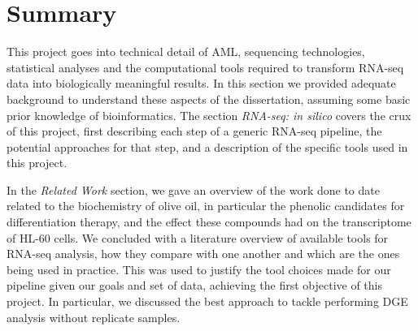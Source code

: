 \section{Summary}
This project goes into technical detail of \ac{AML}, sequencing technologies, statistical analyses and the computational tools required to transform RNA-seq data into biologically meaningful results. In this section we provided adequate background to understand these aspects of the dissertation, assuming some basic prior knowledge of bioinformatics. The section \textit{RNA-seq: in silico} covers the crux of this project, first describing each step of a generic RNA-seq pipeline, the potential approaches for that step, and a description of the specific tools used in this project.

In the \textit{Related Work} section, we gave an overview of the work done to date related to the biochemistry of olive oil, in particular the phenolic candidates for differentiation therapy, and the effect these compounds had on the transcriptome of HL-60 cells. We concluded with a literature overview of available tools for RNA-seq analysis, how they compare with one another and which are the ones being used in practice. This was used to justify the tool choices made for our pipeline given our goals and set of data, achieving the first objective of this project. In particular, we discussed the best approach to tackle performing \ac{DGE} analysis without replicate samples.



